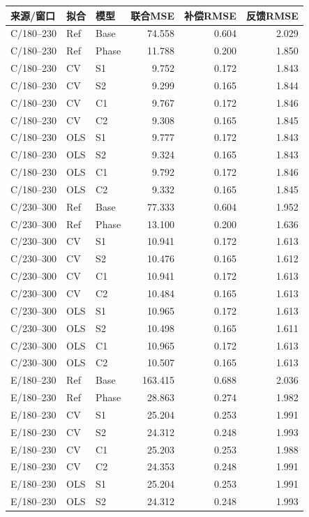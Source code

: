 \documentclass[11pt,a4paper]{article}
\begin{document}
\small\begin{longtable}{lllr rr}\toprule
来源/窗口 & 拟合 & 模型 & 联合MSE & 补偿RMSE & 反馈RMSE\\\midrule\endhead
C/180--230 & Ref & Base & 74.558 & 0.604 & 2.029\\
C/180--230 & Ref & Phase & 11.788 & 0.200 & 1.850\\
C/180--230 & CV & S1 & 9.752 & 0.172 & 1.843\\
C/180--230 & CV & S2 & 9.299 & 0.165 & 1.844\\
C/180--230 & CV & C1 & 9.767 & 0.172 & 1.846\\
C/180--230 & CV & C2 & 9.308 & 0.165 & 1.845\\
C/180--230 & OLS & S1 & 9.777 & 0.172 & 1.843\\
C/180--230 & OLS & S2 & 9.324 & 0.165 & 1.843\\
C/180--230 & OLS & C1 & 9.792 & 0.172 & 1.846\\
C/180--230 & OLS & C2 & 9.332 & 0.165 & 1.845\\
C/230--300 & Ref & Base & 77.333 & 0.604 & 1.952\\
C/230--300 & Ref & Phase & 13.100 & 0.200 & 1.636\\
C/230--300 & CV & S1 & 10.941 & 0.172 & 1.613\\
C/230--300 & CV & S2 & 10.476 & 0.165 & 1.612\\
C/230--300 & CV & C1 & 10.941 & 0.172 & 1.613\\
C/230--300 & CV & C2 & 10.484 & 0.165 & 1.613\\
C/230--300 & OLS & S1 & 10.965 & 0.172 & 1.613\\
C/230--300 & OLS & S2 & 10.498 & 0.165 & 1.611\\
C/230--300 & OLS & C1 & 10.965 & 0.172 & 1.613\\
C/230--300 & OLS & C2 & 10.507 & 0.165 & 1.613\\
E/180--230 & Ref & Base & 163.415 & 0.688 & 2.036\\
E/180--230 & Ref & Phase & 28.863 & 0.274 & 1.982\\
E/180--230 & CV & S1 & 25.204 & 0.253 & 1.991\\
E/180--230 & CV & S2 & 24.312 & 0.248 & 1.993\\
E/180--230 & CV & C1 & 25.203 & 0.253 & 1.988\\
E/180--230 & CV & C2 & 24.353 & 0.248 & 1.991\\
E/180--230 & OLS & S1 & 25.204 & 0.253 & 1.991\\
E/180--230 & OLS & S2 & 24.312 & 0.248 & 1.993\\

\end{longtable}
\end{document}
